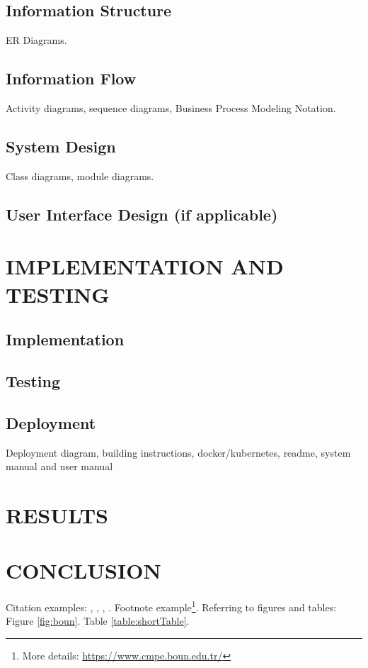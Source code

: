 \documentclass[a4paper,12pt]{report}
\begin{document}
\section{Information Structure}
ER Diagrams.

\section{Information Flow}
Activity diagrams, sequence diagrams, Business Process Modeling Notation.

\section{System Design}
Class diagrams, module diagrams.

\section{User Interface Design (if applicable)}

\chapter{IMPLEMENTATION AND TESTING}
\section{Implementation}
\section{Testing}
\section{Deployment}
Deployment diagram, building instructions, docker/kubernetes, readme, system manual and user manual

\chapter{RESULTS}

\chapter{CONCLUSION}

Citation examples: \cite{conference1}, \cite{article1}, \cite{book1}, \cite{mit}. Footnote example\footnote{More details: {\url{https://www.cmpe.boun.edu.tr/}}}. Referring to figures and tables: Figure \ref{fig:boun}. Table \ref{table:shortTable}.
\end{document}

